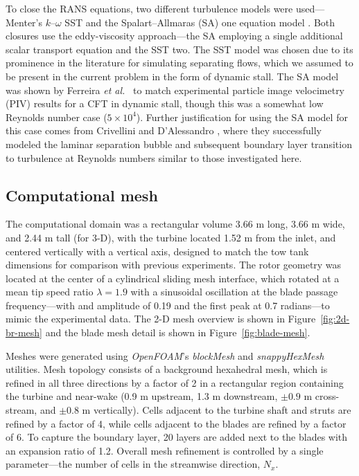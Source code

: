 To close the RANS equations, two different turbulence models were
used---Menter's $k$--$\omega$ SST \cite{Menter1994} and the Spalart--Allmaras
(SA) one equation model \cite{Spalart1992}. Both closures use the eddy-viscosity
approach---the SA employing a single additional scalar transport equation and
the SST two. The SST model was chosen due to its prominence in the literature
for simulating separating flows, which we assumed to be present in the current
problem in the form of dynamic stall. The SA model was shown by Ferreira
\emph{et al.}~\cite{Ferreira2007} to match experimental particle image
velocimetry (PIV) results for a CFT in dynamic stall, though this was a somewhat
low Reynolds number case ($5 \times 10^4$). Further justification for using the
SA model for this case comes from Crivellini and D'Alessandro
\cite{Crivellini2014}, where they successfully modeled the laminar separation
bubble and subsequent boundary layer transition to turbulence at Reynolds
numbers similar to those investigated here.


\subsection{Computational mesh}

The computational domain was a rectangular volume 3.66 m long, 3.66 m wide, and
2.44 m tall (for 3-D), with the turbine located 1.52 m from the inlet, and
centered vertically with a vertical axis, designed to match the tow tank
dimensions for comparison with previous experiments. The rotor geometry was
located at the center of a cylindrical sliding mesh interface, which rotated at
a mean tip speed ratio $\lambda=1.9$ with a sinusoidal oscillation at the blade
passage frequency---with and amplitude of 0.19 and the first peak at 0.7
radians---to mimic the experimental data. The 2-D mesh overview is shown in
Figure~\ref{fig:2d-br-mesh} and the blade mesh detail is shown in
Figure~\ref{fig:blade-mesh}.

Meshes were generated using \textit{OpenFOAM}'s \textit{blockMesh} and
\textit{snappyHexMesh} utilities. Mesh topology consists of a background
hexahedral mesh, which is refined in all three directions by a factor of 2 in a
rectangular region containing the turbine and near-wake (0.9 m upstream, 1.3 m
downstream, $\pm 0.9$ m cross-stream, and $\pm 0.8$ m vertically). Cells
adjacent to the turbine shaft and struts are refined by a factor of 4, while
cells adjacent to the blades are refined by a factor of 6. To capture the
boundary layer, 20 layers are added next to the blades with an expansion ratio
of 1.2. Overall mesh refinement is controlled by a single parameter---the number
of cells in the streamwise direction, $N_x$.


